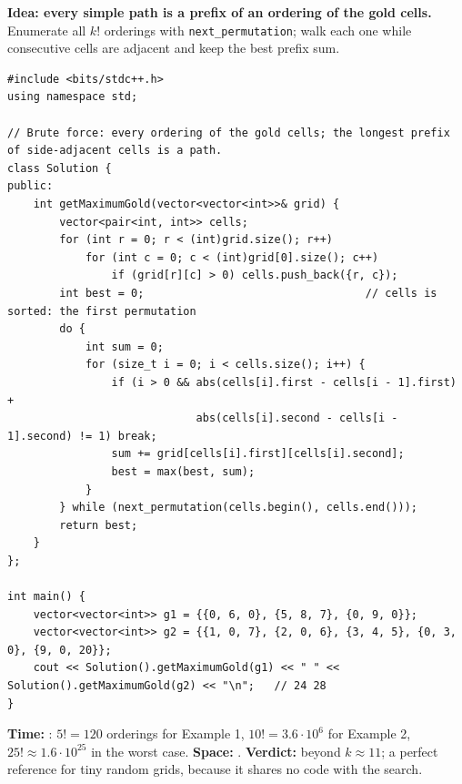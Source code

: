 \begin{bruteforcebox}
\textbf{Idea: every simple path is a prefix of an ordering of the gold cells.} Enumerate all $k!$ orderings with \texttt{next\_permutation}; walk each one while consecutive cells are adjacent and keep the best prefix sum.

\begin{lstlisting}[style=cpp]
#include <bits/stdc++.h>
using namespace std;

// Brute force: every ordering of the gold cells; the longest prefix of side-adjacent cells is a path.
class Solution {
public:
    int getMaximumGold(vector<vector<int>>& grid) {
        vector<pair<int, int>> cells;
        for (int r = 0; r < (int)grid.size(); r++)
            for (int c = 0; c < (int)grid[0].size(); c++)
                if (grid[r][c] > 0) cells.push_back({r, c});
        int best = 0;                                  // cells is sorted: the first permutation
        do {
            int sum = 0;
            for (size_t i = 0; i < cells.size(); i++) {
                if (i > 0 && abs(cells[i].first - cells[i - 1].first) +
                             abs(cells[i].second - cells[i - 1].second) != 1) break;
                sum += grid[cells[i].first][cells[i].second];
                best = max(best, sum);
            }
        } while (next_permutation(cells.begin(), cells.end()));
        return best;
    }
};

int main() {
    vector<vector<int>> g1 = {{0, 6, 0}, {5, 8, 7}, {0, 9, 0}};
    vector<vector<int>> g2 = {{1, 0, 7}, {2, 0, 6}, {3, 4, 5}, {0, 3, 0}, {9, 0, 20}};
    cout << Solution().getMaximumGold(g1) << " " << Solution().getMaximumGold(g2) << "\n";   // 24 28
}
\end{lstlisting}

\begin{complexitybox}
\textbf{Time:} : $5! = 120$ orderings for Example 1, $10! = 3.6 \cdot 10^6$ for Example 2, $25! \approx 1.6 \cdot 10^{25}$ in the worst case. \textbf{Space:} . \textbf{Verdict:} \tle{} beyond $k \approx 11$; a perfect reference for tiny random grids, because it shares no code with the search.
\end{complexitybox}
\end{bruteforcebox}

